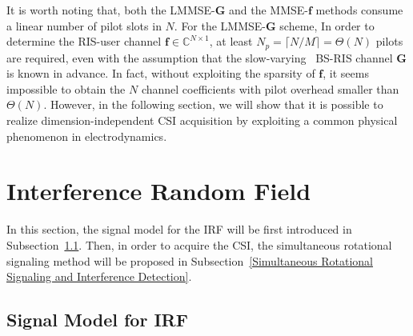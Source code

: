 \documentclass[journal,twocolumn]{IEEEtran}
\theoremstyle{nonumberplain}
\begin{document}
    It is worth noting that, both the LMMSE-$\bm G$ and the MMSE-$\bm f$ methods consume a linear number of pilot slots in $N$. 
    For the LMMSE-$\bm G$ scheme, 
    In order to determine the RIS-user channel $\bm{f}\in\mathbb{C}^{N\times 1}$, at least $N_p = \lceil N/M \rceil = {\Theta}(N)$ pilots are required, even with the assumption that the slow-varying~\cite{Huchen} BS-RIS channel $\bm G$ is known in advance. 
    In fact, without exploiting the sparsity of $\bm f$, it seems impossible to obtain the $N$ channel coefficients with pilot overhead smaller than $\Theta(N)$. 
    However, in the following section, we will show that it is possible to realize dimension-independent CSI acquisition by exploiting a common physical phenomenon in electrodynamics. 
    
\section{Interference Random Field}
\label{Interference Random Field}
    In this section, the signal model for the \ac{IRF} will be first introduced in Subsection~\ref{Models for IRFs}. Then, in order to acquire the CSI, the simultaneous rotational signaling method will be proposed in Subsection~\ref{Simultaneous Rotational Signaling and Interference Detection}. 

\subsection{Signal Model for IRF}
\label{Models for IRFs}
\end{document}
